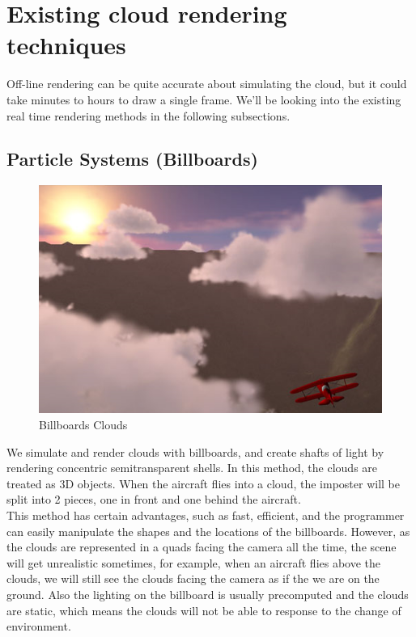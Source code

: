 \section{Existing cloud rendering techniques}
Off-line rendering can be quite accurate about simulating the cloud, but it could take minutes to hours to draw a single frame. We'll be looking into the existing real time rendering methods in the following subsections.

\subsection{Particle Systems (Billboards)}
\begin{figure}[htp]
\begin{center}
\includegraphics[scale=0.8]{images/billboards.png}
\caption{Billboards Clouds}
\label{f2}
\end{center}
\end{figure}

We simulate and render clouds with billboards, and create shafts of light by rendering concentric semitransparent shells. In this method, the clouds are treated as 3D objects. When the aircraft flies into a cloud, the imposter will be split into 2 pieces, one in front and one behind the aircraft.\\
This method has certain advantages, such as fast, efficient, and the programmer can easily manipulate the shapes and the locations of the billboards. However, as the clouds are represented in a quads facing the camera all the time, the scene will get unrealistic sometimes, for example, when an aircraft flies above the clouds, we will still see the clouds facing the camera as if the we are on the ground. Also the lighting on the billboard is usually precomputed and the clouds are static, which means the clouds will not be able to response to the change of environment.

